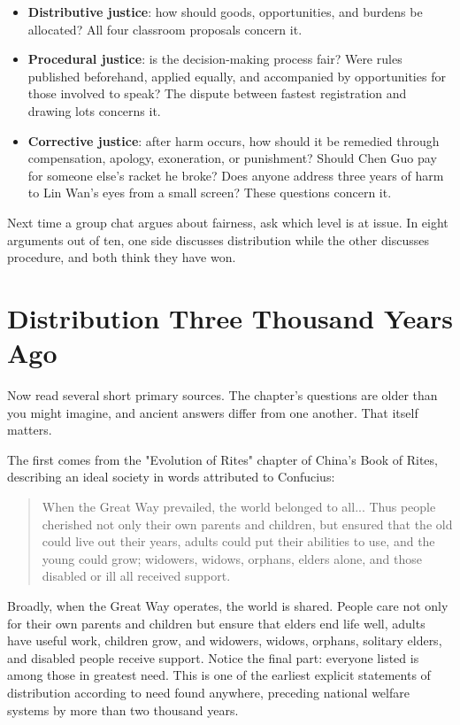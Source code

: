\begin{itemize}
\item \textbf{Distributive justice}: how should goods, opportunities, and burdens be allocated? All four classroom proposals concern it.
\item \textbf{Procedural justice}: is the decision-making process fair? Were rules published beforehand, applied equally, and accompanied by opportunities for those involved to speak? The dispute between fastest registration and drawing lots concerns it.
\item \textbf{Corrective justice}: after harm occurs, how should it be remedied through compensation, apology, exoneration, or punishment? Should Chen Guo pay for someone else's racket he broke? Does anyone address three years of harm to Lin Wan's eyes from a small screen? These questions concern it.
\end{itemize}
Next time a group chat argues about fairness, ask which level is at issue. In eight arguments out of ten, one side discusses distribution while the other discusses procedure, and both think they have won.

\section{Distribution Three Thousand Years Ago}
Now read several short primary sources. The chapter's questions are older than you might imagine, and ancient answers differ from one another. That itself matters.

The first comes from the "Evolution of Rites" chapter of China's Book of Rites, describing an ideal society in words attributed to Confucius:

\begin{quote}
When the Great Way prevailed, the world belonged to all... Thus people cherished not only their own parents and children, but ensured that the old could live out their years, adults could put their abilities to use, and the young could grow; widowers, widows, orphans, elders alone, and those disabled or ill all received support.
\end{quote}
Broadly, when the Great Way operates, the world is shared. People care not only for their own parents and children but ensure that elders end life well, adults have useful work, children grow, and widowers, widows, orphans, solitary elders, and disabled people receive support. Notice the final part: everyone listed is among those in greatest need. This is one of the earliest explicit statements of distribution according to need found anywhere, preceding national welfare systems by more than two thousand years.


